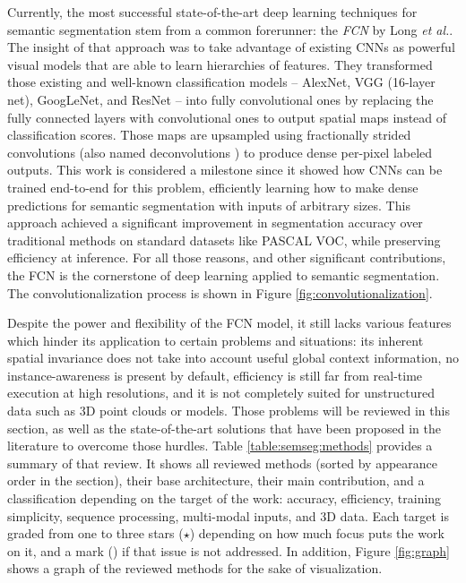 Currently, the most successful state-of-the-art deep learning techniques for semantic segmentation stem from a common forerunner: the \emph{\acf{FCN}} by Long \emph{et al.}\cite{Long2015}. The insight of that approach was to take advantage of existing \acp{CNN} as powerful visual models that are able to learn hierarchies of features. They transformed those existing and well-known classification models -- AlexNet\cite{Krizhevsky2012}, \ac{VGG} (16-layer net)\cite{Simonyan2014}, GoogLeNet\cite{Szegedy2015}, and ResNet \cite{He2016} -- into fully convolutional ones by replacing the fully connected layers with convolutional ones to output spatial maps instead of classification scores. Those maps are upsampled using fractionally strided convolutions (also named deconvolutions \cite{Zeiler2011, Zeiler2014}) to produce dense per-pixel labeled outputs. This work is considered a milestone since it showed how \acp{CNN} can be trained end-to-end for this problem, efficiently learning how to make dense predictions for semantic segmentation with inputs of arbitrary sizes. This approach achieved a significant improvement in segmentation accuracy over traditional methods on standard datasets like PASCAL \ac{VOC}, while preserving efficiency at inference. For all those reasons, and other significant contributions, the \ac{FCN} is the cornerstone of deep learning applied to semantic segmentation. The convolutionalization process is shown in Figure \ref{fig:convolutionalization}.

Despite the power and flexibility of the \acs{FCN} model, it still lacks various features which hinder its application to certain problems and situations: its inherent spatial invariance does not take into account useful global context information, no instance-awareness is present by default, efficiency is still far from real-time execution at high resolutions, and it is not completely suited for unstructured data such as \acs{3D} point clouds or models. Those problems will be reviewed in this section, as well as the state-of-the-art solutions that have been proposed in the literature to overcome those hurdles. Table \ref{table:semseg:methods} provides a summary of that review. It shows all reviewed methods (sorted by appearance order in the section), their base architecture, their main contribution, and a classification depending on the target of the work: accuracy, efficiency, training simplicity, sequence processing, multi-modal inputs, and \acs{3D} data. Each target is graded from one to three stars ($\star$) depending on how much focus puts the work on it, and a mark (\xmark) if that issue is not addressed. In addition, Figure \ref{fig:graph} shows a graph of the reviewed methods for the sake of visualization.

